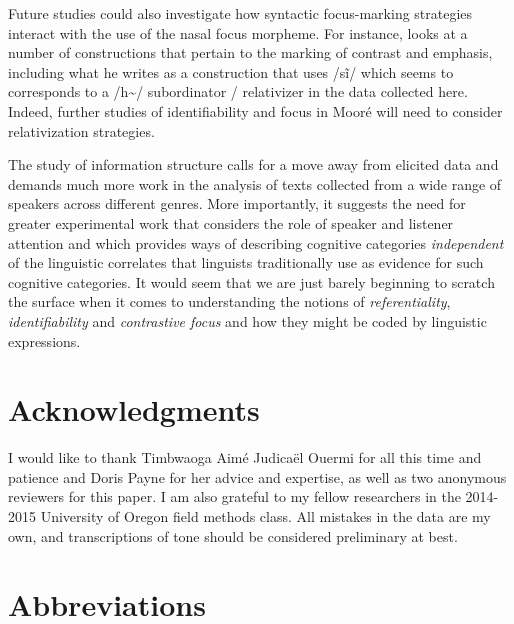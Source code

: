 \documentclass[output=paper]{langsci/langscibook}
\begin{document}
Future studies could also investigate how syntactic focus-marking strategies interact with the use of the nasal focus morpheme. For instance, \citet[445-450]{Kabore1985} looks at a number of constructions that pertain to the marking of contrast and emphasis, including what he writes as a construction that uses /s\~{i}/ which seems to corresponds to a /h\~{\schwa}/ subordinator / relativizer in the data collected here. Indeed, further studies of identifiability and focus in Mooré will need to consider relativization strategies.

The study of information structure calls for a move away from elicited data and demands much more work in the analysis of texts collected from a wide range of speakers across different genres. More importantly, it suggests the need for greater experimental work that considers the role of speaker and listener attention and which provides ways of describing cognitive categories \textit{independent} of the linguistic correlates that linguists traditionally use as evidence for such cognitive categories. It would seem that we are just barely beginning to scratch the surface when it comes to understanding the notions of \textit{referentiality}, \textit{identifiability} and \textit{contrastive focus} and how they might be coded by linguistic expressions.

\section*{\textbf{Acknowledgments}}

I would like to thank Timbwaoga Aimé Judicaël Ouermi for all this time and patience and Doris Payne for her advice and expertise, as well as two anonymous reviewers for this paper. I am also grateful to my fellow researchers in the 2014-2015 University of Oregon field methods class. All mistakes in the data are my own, and transcriptions of tone should be considered preliminary at best.

\section*{Abbreviations}
\end{document}
